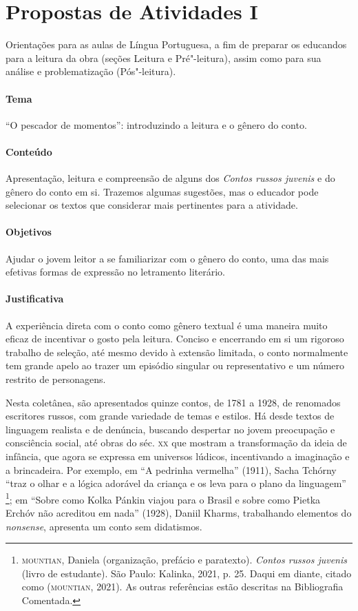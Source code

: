\documentclass[11pt]{extarticle}
\begin{document}
\section{Propostas de Atividades I}

Orientações para as aulas de Língua Portuguesa, a fim de preparar
os educandos para a leitura da obra (seções Leitura e Pré"-leitura), assim como para
sua análise e problematização (Pós"-leitura).

\paragraph{Tema} ``O pescador de momentos'': introduzindo a leitura e o gênero do conto.

\paragraph{Conteúdo}
Apresentação, leitura e compreensão de alguns dos \emph{Contos russos
juvenis} e do gênero do conto em si. Trazemos algumas sugestões, mas o
educador pode selecionar os textos que considerar mais pertinentes para
a atividade.

\paragraph{Objetivos}
Ajudar o jovem leitor a se familiarizar com o gênero do conto, uma das
mais efetivas formas de expressão no letramento literário.

\paragraph{Justificativa}
A experiência direta com o conto como gênero textual é uma maneira muito
eficaz de incentivar o gosto pela leitura. Conciso e encerrando em si um
rigoroso trabalho de seleção, até mesmo devido à extensão limitada, o
conto normalmente tem grande apelo ao trazer um episódio singular ou
representativo e um número restrito de personagens.

Nesta coletânea, são apresentados quinze contos, de 1781 a 1928, de
renomados escritores russos, com grande variedade de temas e estilos. Há
desde textos de linguagem realista e de denúncia, buscando despertar no
jovem preocupação e consciência social, até obras do séc. \textsc{xx} que mostram
a transformação da ideia de infância, que agora se expressa em universos
lúdicos, incentivando a imaginação e a brincadeira. Por exemplo, em ``A
pedrinha vermelha'' (1911), Sacha Tchórny ``traz o olhar e a
lógica adorável da criança e os leva para o plano da linguagem''
\footnote{\textsc{mountian}, Daniela (organização, prefácio e paratexto). \emph{Contos russos juvenis} (livro de estudante). São Paulo: Kalinka, 2021, p. 25. Daqui em diante, citado como (\textsc{mountian}, 2021). As outras referências estão descritas na Bibliografia Comentada.}; em ``Sobre como Kolka Pánkin viajou para o
Brasil e sobre como Pietka Erchóv não acreditou em nada'' (1928), Daniil
Kharms, trabalhando elementos do \emph{nonsense}, apresenta um conto sem didatismos.
\end{document}
